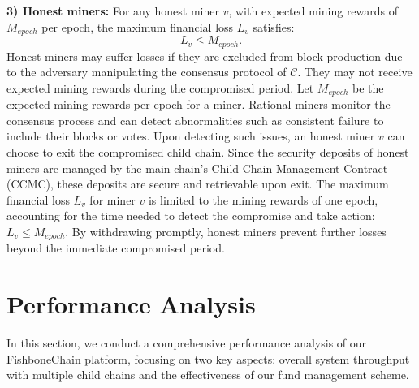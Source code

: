 \documentclass[10pt,journal]{IEEEtran}
\begin{document}
\noindent\textbf{3) Honest miners:} For any honest miner $v$, with expected mining rewards of $M_{epoch}$ per epoch, the maximum financial loss $L_v$ satisfies:
    \begin{equation}
        L_v \leq M_{epoch}.
    \end{equation}
    Honest miners may suffer losses if they are excluded from block production due to the adversary manipulating the consensus protocol of $\mathcal{C}$. They may not receive expected mining rewards during the compromised period. Let $M_{epoch}$ be the expected mining rewards per epoch for a miner. Rational miners monitor the consensus process and can detect abnormalities such as consistent failure to include their blocks or votes. Upon detecting such issues, an honest miner $v$ can choose to exit the compromised child chain. Since the security deposits of honest miners are managed by the main chain's Child Chain Management Contract (CCMC), these deposits are secure and retrievable upon exit. The maximum financial loss $L_v$ for miner $v$ is limited to the mining rewards of one epoch, accounting for the time needed to detect the compromise and take action: $L_v \leq M_{epoch}$. By withdrawing promptly, honest miners prevent further losses beyond the immediate compromised period.
    
\section{Performance Analysis}\label{section:performance_analysis}
In this section, we conduct a comprehensive performance analysis of our FishboneChain platform, focusing on two key aspects: overall system throughput with multiple child chains and the effectiveness of our fund management scheme.
\end{document}

